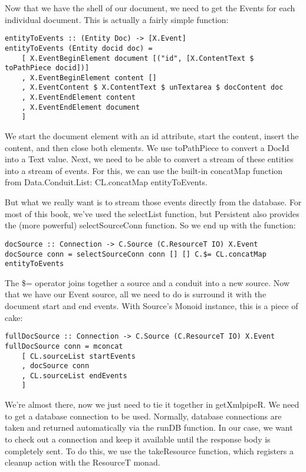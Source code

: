Now that we have the shell of our document, we need to get the Events for each individual document. This is actually a fairly simple function:

\begin{lstlisting}
entityToEvents :: (Entity Doc) -> [X.Event]
entityToEvents (Entity docid doc) =
    [ X.EventBeginElement document [("id", [X.ContentText $ toPathPiece docid])]
    , X.EventBeginElement content []
    , X.EventContent $ X.ContentText $ unTextarea $ docContent doc
    , X.EventEndElement content
    , X.EventEndElement document
    ]
\end{lstlisting}

We start the document element with an id attribute, start the content, insert the content, and then close both elements. We use toPathPiece to convert a DocId into a Text value. Next, we need to be able to convert a stream of these entities into a stream of events. For this, we can use the built-in concatMap function from Data.Conduit.List: CL.concatMap entityToEvents.

But what we really want is to stream those events directly from the database. For most of this book, we've used the selectList function, but Persistent also provides the (more powerful) selectSourceConn function. So we end up with the function:

\begin{lstlisting}
docSource :: Connection -> C.Source (C.ResourceT IO) X.Event
docSource conn = selectSourceConn conn [] [] C.$= CL.concatMap entityToEvents
\end{lstlisting}%

The \$= operator joins together a source and a conduit into a new source. Now that we have our Event source, all we need to do is surround it with the document start and end events. With Source's Monoid instance, this is a piece of cake:

\begin{lstlisting}
fullDocSource :: Connection -> C.Source (C.ResourceT IO) X.Event
fullDocSource conn = mconcat
    [ CL.sourceList startEvents
    , docSource conn
    , CL.sourceList endEvents
    ]
\end{lstlisting}

We're almost there, now we just need to tie it together in getXmlpipeR. We need to get a database connection to be used. Normally, database connections are taken and returned automatically via the runDB function. In our case, we want to check out a connection and keep it available until the response body is completely sent. To do this, we use the takeResource function, which registers a cleanup action with the ResourceT monad.

